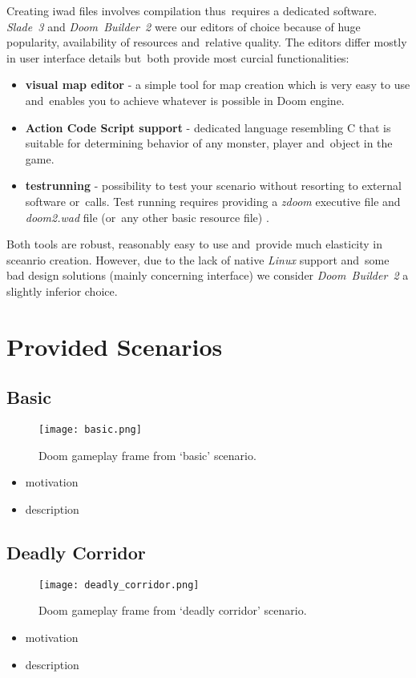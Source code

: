 Creating iwad files involves compilation thus~requires a dedicated software. \emph{Slade~3} and \emph{Doom~Builder~2}  were our editors of choice because of huge popularity, availability of resources and~relative quality. The editors differ mostly in user interface details but~both provide most curcial functionalities:

\begin{itemize}
	\item \textbf{visual map editor} - a simple tool for map creation which is very easy to use and~enables you to achieve whatever is possible in Doom engine.
	\item \textbf{Action Code Script support} - dedicated language resembling C that is suitable for determining behavior of any monster, player and~object in the game.
	\item \textbf{testrunning} - possibility to test your scenario without resorting to external software or~calls. Test running requires providing a \emph{zdoom} executive file and \emph{doom2.wad} file (or~any other basic resource file) . 
\end{itemize}

Both tools are robust, reasonably easy to use and~provide much elasticity in sceanrio creation. However, due to the lack of native \emph{Linux} support and~some bad design solutions (mainly concerning interface) we consider \emph{Doom~Builder~2} a slightly inferior choice. 

\newpage
\section{Provided Scenarios}\label{sec:scenarios}
\subsection{Basic}\label{subsec:basic}
	
	\begin{figure}
		\centering
		\texttt{[image: basic.png]}
		\caption{Doom gameplay frame from `basic' scenario.}\label{fig:basic}
	\end{figure}
\begin{itemize}
	\item motivation 
	\item description
\end{itemize}

\newpage
\subsection{Deadly Corridor}
	\begin{figure}
		\centering
		\texttt{[image: deadly\_corridor.png]}
		\caption{Doom gameplay frame from `deadly corridor' scenario.}\label{fig:deadly_corridor}
	\end{figure}
\begin{itemize}
	\item motivation
	\item description
\end{itemize}
\newpage

